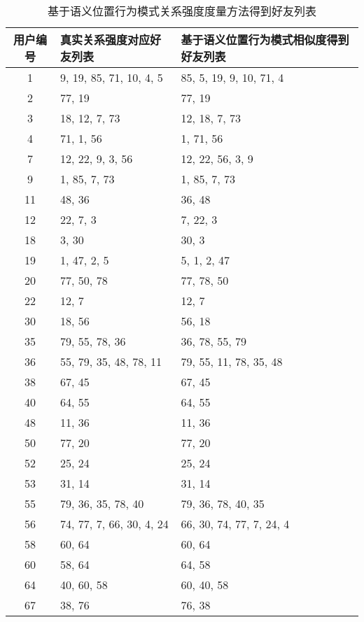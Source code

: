 \begin{table}[htbp]
  \centering
  \caption[基于语义位置行为模式相似度得到好友列表]{基于语义位置行为模式关系强度度量方法得到好友列表}
  \label{tab:locldaResult}
    \begin{tabular}{cll}%
      \toprule[1.5pt]
      用户编号 & 真实关系强度对应好友列表 & 基于语义位置行为模式相似度得到好友列表\\
      \midrule[1pt]
      1 & 9, 19, 85, 71, 10, 4, 5 & 85, 5, 19, 9, 10, 71, 4\\
      2 & 77, 19 & 77, 19\\
      3 & 18, 12, 7, 73 & 12, 18, 7, 73\\
      4 & 71, 1, 56 & 1, 71, 56\\
      7 & 12, 22, 9, 3, 56 & 12, 22, 56, 3, 9\\
      9 & 1, 85, 7, 73 & 1, 85, 7, 73\\
      11 & 48, 36 & 36, 48\\
      12 & 22, 7, 3 & 7, 22, 3\\
      18 & 3, 30 & 30, 3\\
      19 & 1, 47, 2, 5 & 5, 1, 2, 47\\
      20 & 77, 50, 78 & 77, 78, 50\\
      22 & 12, 7 & 12, 7\\
      30 & 18, 56 & 56, 18\\
      35 & 79, 55, 78, 36 & 36, 78, 55, 79\\
      36 & 55, 79, 35, 48, 78, 11 & 79, 55, 11, 78, 35, 48\\
      38 & 67, 45 & 67, 45\\
      40 & 64, 55 & 64, 55\\
      48 & 11, 36 & 11, 36\\
      50 & 77, 20 & 77, 20\\
      52 & 25, 24 & 25, 24\\
      53 & 31, 14 & 31, 14\\
      55 & 79, 36, 35, 78, 40 & 79, 36, 78, 40, 35\\
      56 & 74, 77, 7, 66, 30, 4, 24 & 66, 30, 74, 77, 7, 24, 4\\
      58 & 60, 64 & 60, 64\\
      60 & 58, 64 & 64, 58\\
      64 & 40, 60, 58 & 60, 40, 58\\
      67 & 38, 76 & 76, 38\\

\end{tabular}
\end{table}
